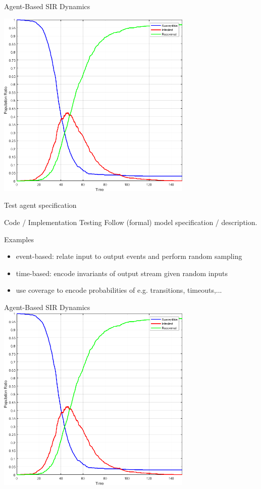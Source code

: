 \documentclass{beamer} %
\begin{document}
\begin{frame}{Agent-Based SIR Dynamics}
\begin{center}
  \includegraphics[width=0.7\textwidth]{./fig/SIR_Yampa_dt001.png}
\end{center}
\end{frame}

\begin{frame}{Test agent specification}
\begin{block}{Code / Implementation Testing}
Follow (formal) model specification / description.
\end{block}

\begin{block}{Examples}
  \begin{itemize}
    \item event-based: relate input to output events and perform random sampling
    \item time-based: encode invariants of output stream given random inputs
    \item use coverage to encode probabilities of e.g. transitions, timeouts,...
  \end{itemize}
\end{block}
\end{frame}


\begin{frame}{Agent-Based SIR Dynamics}
  \includegraphics[width=0.7\textwidth]{./fig/SIR_Yampa_dt001.png}
\end{frame}
\end{document}
